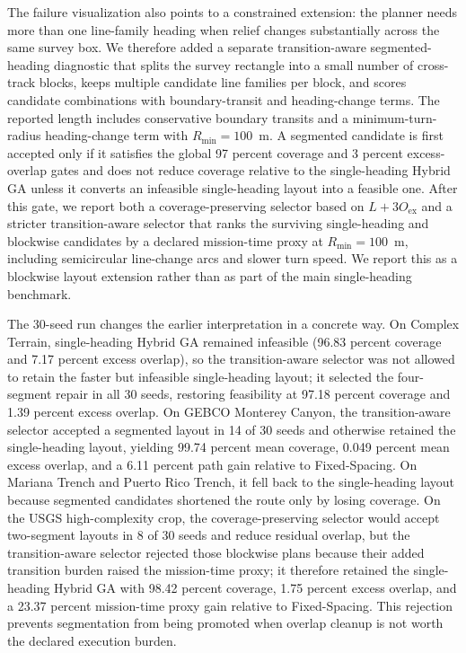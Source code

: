 \documentclass[jmse,article,submit,moreauthors]{Definitions/mdpi}
\begin{document}
The failure visualization also points to a constrained extension: the planner needs more than one line-family heading when relief changes substantially across the same survey box. We therefore added a separate transition-aware segmented-heading diagnostic that splits the survey rectangle into a small number of cross-track blocks, keeps multiple candidate line families per block, and scores candidate combinations with boundary-transit and heading-change terms. The reported length includes conservative boundary transits and a minimum-turn-radius heading-change term with \(R_{\min}=100\)~m. A segmented candidate is first accepted only if it satisfies the global 97 percent coverage and 3 percent excess-overlap gates and does not reduce coverage relative to the single-heading Hybrid GA unless it converts an infeasible single-heading layout into a feasible one. After this gate, we report both a coverage-preserving selector based on \(L+3O_{\mathrm{ex}}\) and a stricter transition-aware selector that ranks the surviving single-heading and blockwise candidates by a declared mission-time proxy at \(R_{\min}=100\)~m, including semicircular line-change arcs and slower turn speed. We report this as a blockwise layout extension rather than as part of the main single-heading benchmark.

The 30-seed run changes the earlier interpretation in a concrete way. On Complex Terrain, single-heading Hybrid GA remained infeasible (96.83 percent coverage and 7.17 percent excess overlap), so the transition-aware selector was not allowed to retain the faster but infeasible single-heading layout; it selected the four-segment repair in all 30 seeds, restoring feasibility at 97.18 percent coverage and 1.39 percent excess overlap. On GEBCO Monterey Canyon, the transition-aware selector accepted a segmented layout in 14 of 30 seeds and otherwise retained the single-heading layout, yielding 99.74 percent mean coverage, 0.049 percent mean excess overlap, and a 6.11 percent path gain relative to Fixed-Spacing. On Mariana Trench and Puerto Rico Trench, it fell back to the single-heading layout because segmented candidates shortened the route only by losing coverage. On the USGS high-complexity crop, the coverage-preserving selector would accept two-segment layouts in 8 of 30 seeds and reduce residual overlap, but the transition-aware selector rejected those blockwise plans because their added transition burden raised the mission-time proxy; it therefore retained the single-heading Hybrid GA with 98.42 percent coverage, 1.75 percent excess overlap, and a 23.37 percent mission-time proxy gain relative to Fixed-Spacing. This rejection prevents segmentation from being promoted when overlap cleanup is not worth the declared execution burden.
\end{document}
